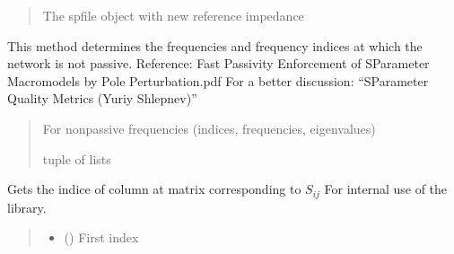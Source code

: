 \documentclass[letterpaper,10pt,english]{sphinxmanual}
\begin{document}
\begin{fulllineitems}
\begin{fulllineitems}
\begin{quote}
\begin{description}
\sphinxAtStartPar
The spfile object with new reference impedance

\sphinxAtStartPar
{\hyperref[\detokenize{touchstone:touchstone.spfile}]{}}

\end{description}\end{quote}

\end{fulllineitems}


\begin{fulllineitems}
\label{\detokenize{touchstone:touchstone.spfile.check_passivity}}
\pysigstartsignatures
{}
\pysigstopsignatures
\sphinxAtStartPar
This method determines the frequencies and frequency indices at which the network is not passive.
Reference: Fast Passivity Enforcement of S\sphinxhyphen{}Parameter Macromodels by Pole Perturbation.pdf
For a better discussion: “S\sphinxhyphen{}Parameter Quality Metrics (Yuriy Shlepnev)”
\begin{quote}\begin{description}
\sphinxAtStartPar
For non\sphinxhyphen{}passive frequencies (indices, frequencies, eigenvalues)

\sphinxhyphen{}tuple of lists

\end{description}\end{quote}

\end{fulllineitems}


\begin{fulllineitems}
\label{\detokenize{touchstone:touchstone.spfile.column_of_data}}
\pysigstartsignatures
{}
\pysigstopsignatures
\sphinxAtStartPar
Gets the indice of column at  matrix corresponding to \(S_{i j}\)
For internal use of the library.
\begin{quote}\begin{description}
\begin{itemize}
\item {}
\sphinxAtStartPar
{} () \textendash{} First index


\end{itemize}
\end{description}
\end{quote}
\end{fulllineitems}
\end{fulllineitems}
\end{document}

